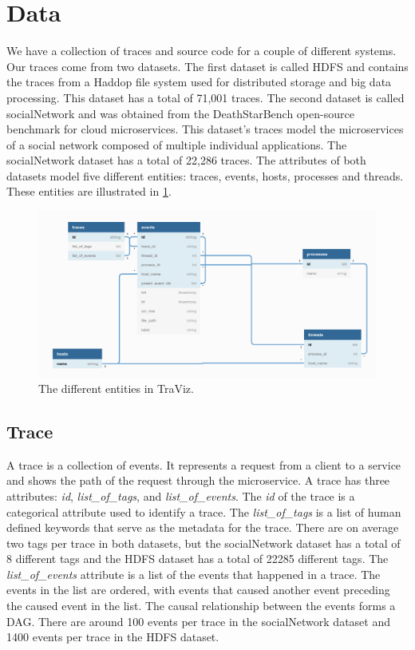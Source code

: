 \section{Data}

We have a collection of traces and source code for a couple of different systems. Our traces come from two datasets.
The first dataset is called HDFS and contains the traces from a Haddop file system used for distributed storage 
and big data processing. This dataset has a total of 71,001 traces. The second dataset is called socialNetwork and
was obtained from the DeathStarBench open-source benchmark for cloud microservices. This dataset's traces model
the microservices of a social network composed of multiple individual applications. The socialNetwork dataset has
a total of 22,286 traces. The attributes of both datasets model five different entities: traces, events, hosts,
processes and threads. These entities are illustrated in \ref{fig:entities}.

\begin{figure}
    \includegraphics[width=\linewidth]{../data_abstractions.png}
    \caption{The different entities in TraViz.}
    \label{fig:entities}
  \end{figure}

\subsection{Trace}

A trace is a collection of events. It represents a request from a client to a service and shows the path of the
request through the microservice. A trace has three attributes: \textit{id}, \textit{list\_of\_tags}, and \textit{list\_of\_events}.
The \textit{id} of the trace is a categorical attribute used to identify a trace. The \textit{list\_of\_tags} is a list of human defined keywords that serve as
the metadata for the trace. There are on average two tags per trace in both datasets, but the socialNetwork
dataset has a total of 8 different tags and the HDFS dataset has a total of 22285 different tags. The
\textit{list\_of\_events} attribute is a list of the events that happened in a trace. The events in the list
are ordered, with events that caused another event preceding the caused event in the list. The causal relationship
between the events forms a DAG. There are around 100 events per trace in the socialNetwork dataset and 1400 events per trace
in the HDFS dataset.

